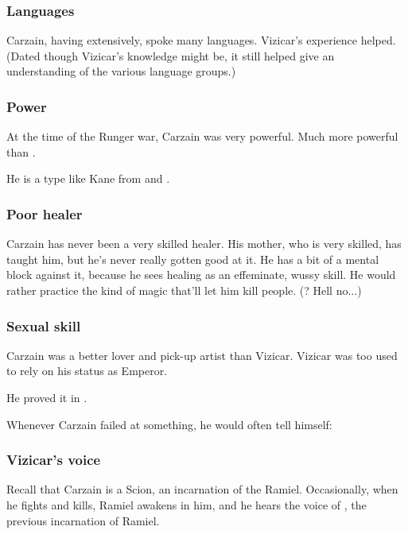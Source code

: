 \subsubsection{Languages}
Carzain, having \travelled extensively, spoke many languages. 
Vizicar's experience helped. 
(Dated though Vizicar's knowledge might be, it still helped give an understanding of the various language groups.)





\subsubsection{Power}
At the time of the Runger war, Carzain was very powerful. 
Much more powerful than . 

He is a type like Kane from \cite{KarlEdwardWagner:GodsInDarkness} and \cite{KarlEdwardWagner:MidnightSun}. 





\subsubsection{Poor healer}
Carzain has never been a very skilled healer. 
His mother, who is very skilled, has taught him, but he's never really gotten good at it. 
He has a bit of a mental block against it, because he sees healing as an effeminate, wussy skill. 
He would rather practice the kind of magic that'll let him kill people. 
(? Hell no...)




\subsubsection{Sexual skill}
Carzain was a better lover and pick-up artist than Vizicar. 
Vizicar was too used to rely on his status as Emperor. 

He proved it in . 

Whenever Carzain failed at something, he would often tell himself: 





\subsubsection{Vizicar's voice}
Recall that Carzain is a Scion, an incarnation of the \Malach{} Ramiel. 
Occasionally, when he fights and kills, Ramiel awakens in him, and he hears the voice of \VizicarDurasRespina, the previous incarnation of Ramiel. 

